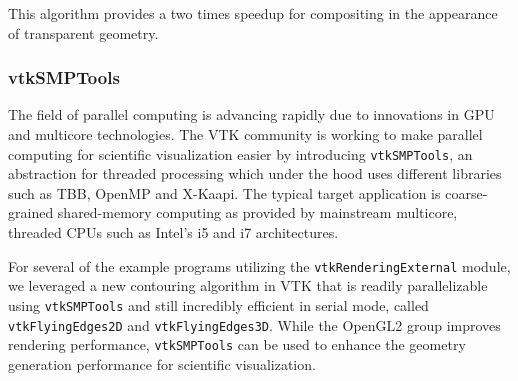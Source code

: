 This algorithm provides a two times speedup for compositing in the appearance of transparent geometry.

\subsubsection{vtkSMPTools}

The field of parallel computing is advancing rapidly due to innovations in GPU and multicore technologies.
The VTK community is working to make parallel computing for scientific visualization easier by introducing \texttt{vtkSMPTools}, an abstraction for threaded processing which under the hood uses different libraries such as TBB, OpenMP and X-Kaapi.
The typical target application is coarse-grained shared-memory computing as provided by mainstream multicore, threaded CPUs such as Intel's i5 and i7 architectures.

For several of the example programs utilizing the \texttt{vtkRenderingExternal} module, we leveraged a new contouring algorithm in VTK that is readily parallelizable using \texttt{vtkSMPTools} and still incredibly efficient in serial mode, called \texttt{vtkFlyingEdges2D} and \texttt{vtkFlyingEdges3D}.
While the OpenGL2 group improves rendering performance, \texttt{vtkSMPTools} can be used to enhance the geometry generation performance for scientific visualization.
